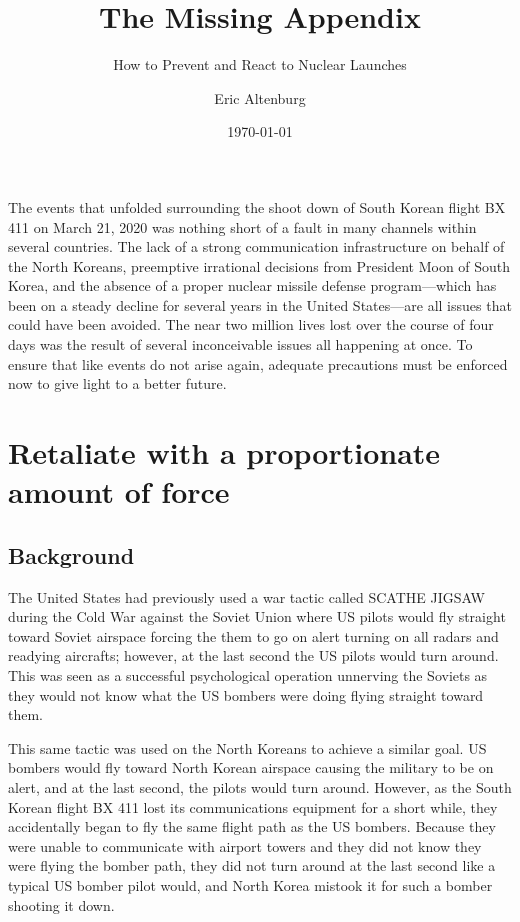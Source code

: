 \documentclass[12pt]{turabian-researchpaper}
\title{The Missing Appendix}
\subtitle{How to Prevent and React to Nuclear Launches}
\author{Eric Altenburg}
\date{\today}
\begin{document}
\maketitle

\tableofcontents

\newpage

The events that unfolded surrounding the shoot down of South Korean flight BX 411 on March 21, 2020 was nothing short of a fault in many channels within several countries. The lack of a strong communication infrastructure on behalf of the North Koreans, preemptive irrational decisions from President Moon of South Korea, and the absence of a proper nuclear missile defense program—which has been on a steady decline for several years in the United States—are all issues that could have been avoided. The near two million lives lost over the course of four days was the result of several inconceivable issues all happening at once. To ensure that like events do not arise again, adequate precautions must be enforced now to give light to a better future.


\section{Retaliate with a proportionate amount of force}

\subsection{Background}
	
	The United States had previously used a war tactic called SCATHE JIGSAW during the Cold War against the Soviet Union where US pilots would fly straight toward Soviet airspace forcing the them to go on alert turning on all radars and readying aircrafts; however, at the last second the US pilots would turn around. This was seen as a successful psychological operation unnerving the Soviets as they would not know what the US bombers were doing flying straight toward them. 

	This same tactic was used on the North Koreans to achieve a similar goal. US bombers would fly toward North Korean airspace causing the military to be on alert, and at the last second, the pilots would turn around. However, as the South Korean flight BX 411 lost its communications equipment for a short while, they accidentally began to fly the same flight path as the US bombers. Because they were unable to communicate with airport towers and they did not know they were flying the bomber path, they did not turn around at the last second like a typical US bomber pilot would, and North Korea mistook it for such a bomber shooting it down.
\end{document}
